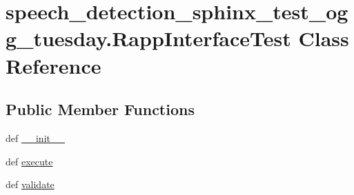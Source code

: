 \hypertarget{classspeech__detection__sphinx__test__ogg__tuesday_1_1RappInterfaceTest}{\section{speech\-\_\-detection\-\_\-sphinx\-\_\-test\-\_\-ogg\-\_\-tuesday.\-Rapp\-Interface\-Test Class Reference}
\label{classspeech__detection__sphinx__test__ogg__tuesday_1_1RappInterfaceTest}
}
\subsection*{Public Member Functions}
\begin{DoxyCompactItemize}
\item 
def \hyperlink{classspeech__detection__sphinx__test__ogg__tuesday_1_1RappInterfaceTest_aab138934aba736a5fee49f225a60c250}{\-\_\-\-\_\-init\-\_\-\-\_\-}
\item 
def \hyperlink{classspeech__detection__sphinx__test__ogg__tuesday_1_1RappInterfaceTest_a3b7df600254601fc275cd7daba8ae461}{execute}
\item 
def \hyperlink{classspeech__detection__sphinx__test__ogg__tuesday_1_1RappInterfaceTest_a43af2e6d9bf897d12f7faf9a590b60e7}{validate}
\end{DoxyCompactItemize}
